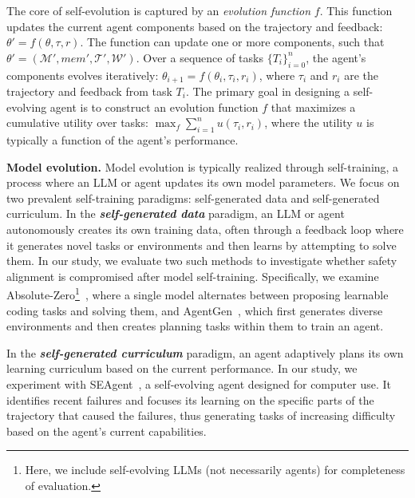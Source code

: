 \documentclass{article} %
\begin{document}
The core of self-evolution is captured by an \textit{evolution function} {\small$f$}. This function updates the current agent components based on the trajectory and feedback: {\small$\theta'=f(\theta, \tau, r)$}. The function can update one or more components, such that {\small$\theta'=(\mathcal{M}', mem', \mathcal{T}', \mathcal{W}')$}. 
Over a sequence of tasks {\small$\{T_i\}_{i=0}^n$}, the agent's components evolves iteratively: {\small$\theta_{i+1} = f(\theta_i, \tau_i, r_i)$}, where {\small$\tau_i$} and {\small$r_i$} are the trajectory and feedback from task {\small$T_i$}. 
The primary goal in designing a self-evolving agent is to construct an evolution function $f$ that maximizes a cumulative utility over tasks: 
{\small$\max_f \sum_{i=1}^n u(\tau_i, r_i)$}, where the utility $u$ is typically a function of the agent's performance. 


\textbf{Model evolution.} Model evolution is typically realized through self-training, a process where an LLM or agent updates its own model parameters. We focus on two prevalent self-training paradigms: self-generated data and self-generated curriculum. 
{In the \textit{\textbf{self-generated data}} paradigm, an LLM or agent autonomously creates its own training data, often through a feedback loop where it generates novel tasks or environments and then learns by attempting to solve them. In our study, we evaluate two such methods to investigate whether safety alignment is compromised after model self-training.
Specifically, we examine Absolute-Zero\footnote{Here, we include self-evolving LLMs (not necessarily agents) for completeness of evaluation.}~\citep{zhao2025absolute}, where a single model alternates between proposing learnable coding tasks and solving them, and AgentGen~\citep{hu2025agentgen}, which first generates diverse environments and then creates planning tasks within them to train an agent.}

In the \textit{\textbf{self-generated curriculum}} paradigm, an agent adaptively plans its own learning curriculum based on the current performance. In our study, we experiment with SEAgent~\citep{sun2025seagent}, a self-evolving agent designed for computer use. {It identifies recent failures and focuses its learning on the specific parts of the trajectory that caused the failures, thus generating tasks of increasing difficulty based on the agent's current capabilities.}
\end{document}
